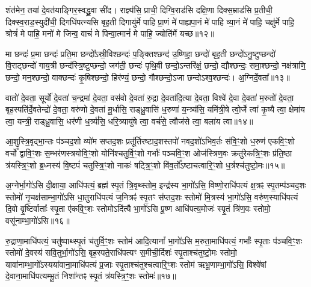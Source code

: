शंत॑मेन॒ तया॑ दे॒वत॑याङ्गिर॒स्वद्ध्रु॒वा सी॑द। राज्ञ्य॑सि॒ प्राची॒ दिग्वि॒राड॑सि दक्षि॒णा दिक्स॒म्राड॑सि प्र॒तीची॒ दिक्स्व॒राड॒स्युदी॑ची॒ दिगधि॑पत्न्यसि बृह॒ती दिगायु॑र्मे पाहि प्रा॒णं मे॑ पाह्यपा॒नं मे॑ पाहि व्या॒नं मे॑ पाहि॒ चक्षु॑र्मे पाहि॒ श्रोत्रं॑ मे पाहि॒ मनो॑ मे जिन्व॒ वाचं॑ मे पिन्वा॒त्मानं॑ मे पाहि॒ ज्योति॑र्मे यच्छ॥१२॥

{\anuvakamend[{छ॒र्दिषा॑ पिन्व॒ षट्च॑॥६॥}]}

मा छन्दः॑ प्र॒मा छन्दः॑ प्रति॒मा छन्दो᳚\-ऽस्री॒विश्छन्दः॑ प॒ङ्क्तिश्छन्द॑ उ॒ष्णिहा॒ छन्दो॑ बृह॒ती छन्दो॑\-ऽनु॒ष्टुप्छन्दो॑ वि॒राट्छन्दो॑ गाय॒त्री छन्द॑स्त्रि॒ष्टुप्छन्दो॒ जग॑ती॒ छन्दः॑ पृथि॒वी छन्दो॒\-ऽन्तरि॑क्षं॒ छन्दो॒ द्यौश्छन्दः॒ समा॒श्छन्दो॒ नक्ष॑त्राणि॒ छन्दो॒ मन॒श्छन्दो॒ वाक्छन्दः॑ कृ॒षिश्छन्दो॒ हिर॑ण्यं॒ छन्दो॒ गौश्छन्दो॒\-ऽजा छन्दो\-ऽश्व॒श्छन्दः॑। अ॒ग्निर्दे॒वता᳚॥१३॥

वातो॑ दे॒वता॒ सूर्यो॑ दे॒वता॑ च॒न्द्रमा॑ दे॒वता॒ वस॑वो दे॒वता॑ रु॒द्रा दे॒वता॑दि॒त्या दे॒वता॒ विश्वे॑ दे॒वा दे॒वता॑ म॒रुतो॑ दे॒वता॒ बृह॒स्पति॑र्दे॒वतेन्द्रो॑ दे॒वता॒ वरु॑णो दे॒वता॑ मू॒र्धासि॒ राड्ध्रु॒वासि॑ ध॒रुणा॑ य॒न्त्र्य॑सि॒ यमि॑त्री॒षे त्वो॒र्जे त्वा॑ कृ॒ष्यै त्वा॒ क्षेमा॑य त्वा॒ यन्त्री॒ राड्ध्रु॒वासि॒ धर॑णी ध॒र्त्र्य॑सि॒ धरि॒त्र्यायु॑षे त्वा॒ वर्च॑से॒ त्वौज॑से त्वा॒ बला॑य त्वा॥१४॥

{\anuvakamend[{दे॒वता\-ऽ\-ऽयु॑षे त्वा॒ षट्च॑॥७॥}]}

आ॒शुस्त्रि॒वृद्भा॒न्तः प॑ञ्चद॒शो व्यो॑म सप्तद॒शः प्रतू᳚र्तिरष्टाद॒शस्तपो॑ नवद॒शो॑\-ऽभिव॒र्तः स॑वि॒ꣳ॒शो ध॒रुण॑ एकवि॒ꣳ॒शो वर्चो᳚ द्वावि॒ꣳ॒शः स॒म्भर॑णस्त्रयोवि॒ꣳ॒शो योनि॑श्चतुर्वि॒ꣳ॒शो गर्भाः᳚ पञ्चवि॒ꣳ॒श ओज॑स्त्रिण॒वः क्रतु॑रेकत्रि॒ꣳ॒शः प्र॑ति॒ष्ठा त्र॑यस्त्रि॒ꣳ॒शो ब्र॒ध्नस्य॑ वि॒ष्टपं॑ चतुस्त्रि॒ꣳ॒शो नाकः॑ षट्त्रि॒ꣳ॒शो वि॑व॒र्तो᳚\-ऽष्टाचत्वारि॒ꣳ॒शो ध॒र्त्रश्च॑तुष्टो॒मः॥१५॥

{\anuvakamend[{आ॒शुः स॒प्तत्रिꣳ॑शत्॥८॥}]}

अ॒ग्नेर्भा॒गो॑\-ऽसि दी॒क्षाया॒ आधि॑पत्यं॒ ब्रह्म॑ स्पृ॒तं त्रि॒वृथ्स्तोम॒ इन्द्र॑स्य भा॒गो॑\-ऽसि॒ विष्णो॒राधि॑पत्यं क्ष॒त्रꣴ स्पृ॒तम्प॑ञ्चद॒शः स्तोमो॑ नृ॒चक्ष॑साम्भा॒गो॑\-ऽसि धा॒तुराधि॑पत्यं ज॒नित्रꣴ॑ स्पृ॒तꣳ स॑प्तद॒शः स्तोमो॑ मि॒त्रस्य॑ भा॒गो॑\-ऽसि॒ वरु॑ण॒स्याधि॑पत्यं दि॒वो वृ॒ष्टिर्वाताः᳚ स्पृ॒ता ए॑कवि॒ꣳ॒शः स्तोमो\-ऽदि॑त्यै भा॒गो॑\-ऽसि पू॒ष्ण आधि॑पत्य॒मोजः॑ स्पृ॒तं त्रि॑ण॒वः स्तोमो॒ वसू॑नाम्भा॒गो॑\-ऽसि॥१६॥

रु॒द्राणा॒माधि॑पत्यं॒ चतु॑ष्पाथ्स्पृ॒तं च॑तुर्वि॒ꣳ॒शः स्तोम॑ आदि॒त्यानां᳚ भा॒गो॑\-ऽसि म॒रुता॒माधि॑पत्यं॒ गर्भाः᳚ स्पृ॒ताः प॑ञ्चवि॒ꣳ॒शः स्तोमो॑ दे॒वस्य॑ सवि॒तुर्भा॒गो॑\-ऽसि॒ बृह॒स्पते॒राधि॑पत्यꣳ स॒मीची॒र्दिशः॑ स्पृ॒ताश्च॑तुष्टो॒मः स्तोमो॒ यावा॑नाम्भा॒गो᳚\-ऽस्यया॑वाना॒माधि॑पत्यं प्र॒जाः स्पृ॒ताश्च॑तुश्चत्वारि॒ꣳ॒शः स्तोम॑ ऋभू॒णाम्भा॒गो॑\-ऽसि॒ विश्वे॑षां दे॒वाना॒माधि॑पत्यम्भू॒तं निशा᳚न्तꣴ स्पृ॒तं त्र॑यस्त्रि॒ꣳ॒शः स्तोमः॑॥१७॥


